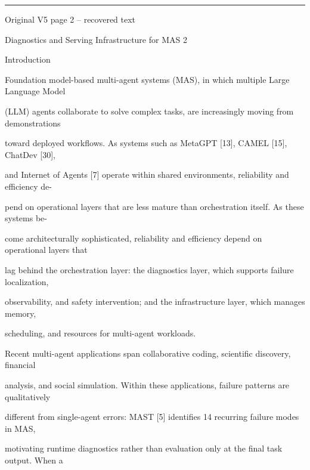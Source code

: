 \par\smallskip\noindent\rule{\textwidth}{0.4pt}\par{\sffamily\footnotesize Original V5 page 2 -- recovered text}\par\begin{flushleft}\footnotesize\ttfamily
\par\smallskip
\par\smallskip
\noindent Diagnostics and Serving Infrastructure for MAS 2\par
\par\smallskip
\par\smallskip
\par\smallskip
{} Introduction\par
\noindent Foundation model-based multi-agent systems (MAS), in which multiple Large Language Model\par
\noindent (LLM) agents collaborate to solve complex tasks, are increasingly moving from demonstrations\par
\noindent toward deployed workflows. As systems such as MetaGPT [13], CAMEL [15], ChatDev [30],\par
\noindent and Internet of Agents [7] operate within shared environments, reliability and efficiency de-\par
\noindent pend on operational layers that are less mature than orchestration itself. As these systems be-\par
\noindent come architecturally sophisticated, reliability and efficiency depend on operational layers that\par
\noindent lag behind the orchestration layer: the diagnostics layer, which supports failure localization,\par
\noindent observability, and safety intervention; and the infrastructure layer, which manages memory,\par
\noindent scheduling, and resources for multi-agent workloads.\par
\noindent  Recent multi-agent applications span collaborative coding, scientific discovery, financial\par
\noindent analysis, and social simulation. Within these applications, failure patterns are qualitatively\par
\noindent different from single-agent errors: MAST [5] identifies 14 recurring failure modes in MAS,\par
\noindent motivating runtime diagnostics rather than evaluation only at the final task output. When a\par

\end{flushleft}
